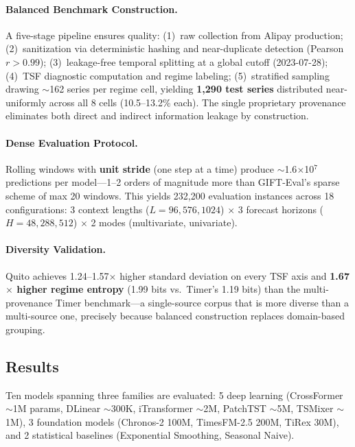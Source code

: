 \documentclass[11pt]{article}
\begin{document}
\paragraph{Balanced Benchmark Construction.}
A five-stage pipeline ensures quality: (1)~raw collection from Alipay production; (2)~sanitization via deterministic hashing and near-duplicate detection (Pearson $r > 0.99$); (3)~leakage-free temporal splitting at a global cutoff (2023-07-28); (4)~TSF diagnostic computation and regime labeling; (5)~stratified sampling drawing $\sim$162 series per regime cell, yielding \textbf{1,290 test series} distributed near-uniformly across all 8 cells (10.5--13.2\% each). The single proprietary provenance eliminates both direct and indirect information leakage by construction.

\paragraph{Dense Evaluation Protocol.}
Rolling windows with \textbf{unit stride} (one step at a time) produce $\sim$1.6$\times$10$^7$ predictions per model---1--2 orders of magnitude more than GIFT-Eval's sparse scheme of max 20 windows. This yields 232,200 evaluation instances across 18 configurations: 3 context lengths ($L=96, 576, 1024$) $\times$ 3 forecast horizons ($H=48, 288, 512$) $\times$ 2 modes (multivariate, univariate).

\paragraph{Diversity Validation.}
Quito achieves 1.24--1.57$\times$ higher standard deviation on every TSF axis and \textbf{1.67$\times$ higher regime entropy} (1.99 bits vs.\ Timer's 1.19 bits) than the multi-provenance Timer benchmark---a single-source corpus that is more diverse than a multi-source one, precisely because balanced construction replaces domain-based grouping.

\subsection{Results}

Ten models spanning three families are evaluated: 5 deep learning (CrossFormer $\sim$1M params, DLinear $\sim$300K, iTransformer $\sim$2M, PatchTST $\sim$5M, TSMixer $\sim$1M), 3 foundation models (Chronos-2 100M, TimesFM-2.5 200M, TiRex 30M), and 2 statistical baselines (Exponential Smoothing, Seasonal Naive).
\end{document}
